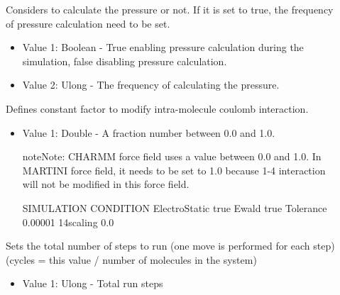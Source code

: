 \documentclass[letterpaper,10pt,english]{sphinxmanual}
\begin{document}
\begin{description}
\item[{}] \leavevmode
Considers to calculate the pressure or not. If it is set to true, the frequency of pressure calculation need to be set.
\begin{itemize}
\item {} 
Value 1: Boolean - True enabling pressure calculation during the simulation, false disabling pressure calculation.

\item {} 
Value 2: Ulong - The frequency of calculating the pressure.

\end{itemize}

\item[{}] \leavevmode
Defines constant factor to modify intra-molecule coulomb interaction.
\begin{itemize}
\item {} 
Value 1: Double - A fraction number between 0.0 and 1.0.

\begin{sphinxadmonition}{note}{Note:}
CHARMM force field uses a value between 0.0 and 1.0. In MARTINI force field, it needs to be set to 1.0 because 1-4 interaction will not be modified in this force field.
\end{sphinxadmonition}

%
\begin{sphinxVerbatim}[commandchars=\\\{\}]
\PYGZsh{}\PYGZsh{}\PYGZsh{}\PYGZsh{}\PYGZsh{}\PYGZsh{}\PYGZsh{}\PYGZsh{}\PYGZsh{}\PYGZsh{}\PYGZsh{}\PYGZsh{}\PYGZsh{}\PYGZsh{}\PYGZsh{}\PYGZsh{}\PYGZsh{}\PYGZsh{}\PYGZsh{}\PYGZsh{}\PYGZsh{}\PYGZsh{}\PYGZsh{}\PYGZsh{}\PYGZsh{}\PYGZsh{}\PYGZsh{}\PYGZsh{}\PYGZsh{}\PYGZsh{}\PYGZsh{}\PYGZsh{}\PYGZsh{}
\PYGZsh{} SIMULATION CONDITION
\PYGZsh{}\PYGZsh{}\PYGZsh{}\PYGZsh{}\PYGZsh{}\PYGZsh{}\PYGZsh{}\PYGZsh{}\PYGZsh{}\PYGZsh{}\PYGZsh{}\PYGZsh{}\PYGZsh{}\PYGZsh{}\PYGZsh{}\PYGZsh{}\PYGZsh{}\PYGZsh{}\PYGZsh{}\PYGZsh{}\PYGZsh{}\PYGZsh{}\PYGZsh{}\PYGZsh{}\PYGZsh{}\PYGZsh{}\PYGZsh{}\PYGZsh{}\PYGZsh{}\PYGZsh{}\PYGZsh{}\PYGZsh{}\PYGZsh{}
ElectroStatic true
Ewald true
Tolerance 0.00001
1\PYGZhy{}4scaling 0.0
\end{sphinxVerbatim}

\end{itemize}

\item[{}] \leavevmode
Sets the total number of steps to run (one move is performed for each step) (cycles = this value / number of molecules in the system)
\begin{itemize}
\item {} 
Value 1: Ulong - Total run steps


\end{itemize}
\end{description}
\end{document}
